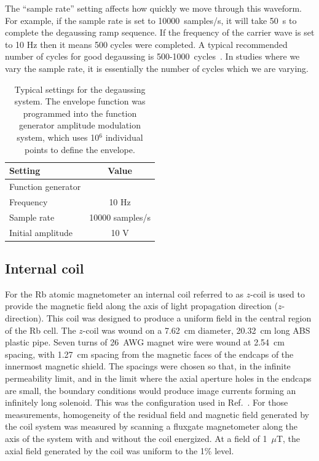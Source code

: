 The ``sample rate'' setting affects how quickly we move through this
waveform.  For example, if the sample rate is set to 10000~samples/s,
it will take 50~s to complete the degaussing ramp sequence.  If the
frequency of the carrier wave is set to 10 Hz then it means 500 cycles
were completed.  A typical recommended number of cycles for good
degaussing is 500-1000~cycles~\cite{doi:10.1063/1.2713433}.  In studies where we
vary the sample rate, it is essentially the number of cycles which we
are varying.
\begin{table}%
\centering
\begin{tabular}{|l|c|}\hline
\textbf{Setting}    & \textbf{Value} \\\hline
Function generator &   \\\hline
Frequency &  10 Hz   \\
Sample rate    &  10000 samples/s  \\
Initial amplitude   &   10 V \\
\hline
\end{tabular}
\caption{Typical settings for the degaussing system.  The envelope
  function was programmed into the function generator amplitude
  modulation system, which uses 10$^6$ individual points to define the
  envelope.\label{table:degaussing-setting}}
\end{table}


\subsection{Internal coil\label{sec:internal-coil}}

For the Rb atomic magnetometer an internal coil referred to as
$z$-coil is used to provide the magnetic field along the axis of light
propagation direction ($z$-direction). This coil was designed to
produce a uniform field in the central region of the Rb cell. The
$z$-coil was wound on a 7.62~cm diameter, 20.32~cm long ABS plastic
pipe. Seven turns of 26~AWG magnet wire were wound at 2.54~cm spacing,
with 1.27~cm spacing from the magnetic faces of the endcaps of the
innermost magnetic shield.  The spacings were chosen so that, in the
infinite permeability limit, and in the limit where the axial aperture
holes in the endcaps are small, the boundary conditions would produce
image currents forming an infinitely long solenoid.  This was the
configuration used in Ref.~\cite{Martin:2014foa}.  For those
measurements, homogeneity of the residual field and magnetic field
generated by the coil system was measured by scanning a fluxgate
magnetometer along the axis of the system with and without the coil
energized. At a field of 1~$\mu$T, the axial field generated by the
coil was uniform to the 1\% level.

